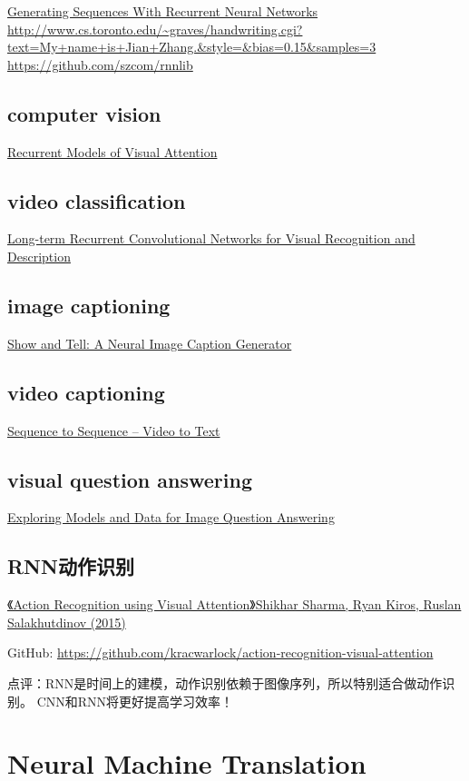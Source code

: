 \documentclass[10pt,a4paper]{ctexbook}
\begin{document}
\href{https://arxiv.org/abs/1308.0850}{Generating Sequences With Recurrent Neural Networks}
\url{http://www.cs.toronto.edu/~graves/handwriting.cgi?text=My+name+is+Jian+Zhang.\&style=\&bias=0.15\&samples=3}
\url{https://github.com/szcom/rnnlib}

\subsection{computer vision}
\href{https://arxiv.org/abs/1406.6247}{Recurrent Models of Visual Attention}


\subsection{video classification}
\href{https://arxiv.org/abs/1411.4389}{Long-term Recurrent Convolutional Networks for Visual Recognition and Description}

\subsection{image captioning}
\href{https://arxiv.org/pdf/1411.4555.pdf}{Show and Tell: A Neural Image Caption Generator}

\subsection{video captioning}
\href{https://arxiv.org/abs/1505.00487}{Sequence to Sequence -- Video to Text}


\subsection{visual question answering}
\href{https://arxiv.org/abs/1505.02074}{Exploring Models and Data for Image Question Answering}


\subsection{RNN动作识别}
\href{http://t.cn/RU8EKNZ}{《Action Recognition using Visual Attention》Shikhar Sharma, Ryan Kiros, Ruslan Salakhutdinov (2015)}

GitHub: \url{https://github.com/kracwarlock/action-recognition-visual-attention}

点评：RNN是时间上的建模，动作识别依赖于图像序列，所以特别适合做动作识别。 CNN和RNN将更好提高学习效率！

\section{Neural Machine Translation}
\end{document}
